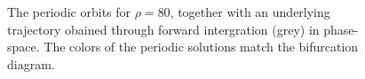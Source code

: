 \begin{figure}
\centering{}
\caption{
	The periodic orbits for $\rho=80$, together with an underlying trajectory obained through forward intergration (grey) in phase-space. 
	The colors of the periodic solutions match the bifurcation diagram.
}
\label{fig:lorenzcut}
\end{figure}

\restoregeometry